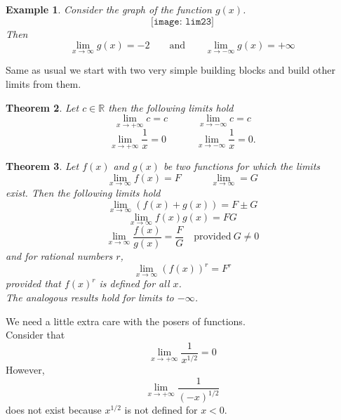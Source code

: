 \documentclass[12pt,a4paper]{book}
\newtheorem{theorem}{Theorem}[section]
\newtheorem{Example}[theorem]{Example}
\numberwithin{equation}{section}
\begin{document}
\begin{Example}
	Consider the graph of the function $g(x)$. 
	$$
	\texttt{[image: lim23]}
	$$
	Then 
	$$\lim_{x\to \infty} g(x)=-2\quad \quad \text{and}\quad \quad \lim_{x\to -\infty} g(x)=+\infty$$ 
\end{Example}
Same as usual we start with two very simple building blocks and build other limits from them.
\begin{theorem}
	Let $c\in \mathbb{R}$ then the following limits hold
	$$\lim_{x\to +\infty} c=c\quad \quad \quad \lim_{x\to -\infty} c=c$$
		$$\lim_{x\to +\infty} \frac{1}{x}=0\quad \quad \quad \lim_{x\to -\infty} \frac{1}{x}=0.$$
\end{theorem}
\begin{tcolorbox}[width=\textwidth,colback={blue!10},title={},colbacktitle=yellow,coltitle=blue] 
\begin{theorem}
	Let $f(x)$ and $g(x)$ be two functions for which the limits 
	$$ \lim_{x\to \infty}f(x)=F\quad \quad \quad \lim_{x\to \infty}=G$$
	exist. Then the following limits hold
	$$
	\lim_{x\to \infty} (f(x)+g(x))=F\pm G
	$$
	$$
	\lim_{x\to \infty}f(x)g(x)=FG
	$$
	$$
	\lim_{x\to \infty}\frac{f(x)}{g(x)}=\frac{F}{G} \quad \text{provided}~G\neq 0
	$$
	and for rational numbers $r$,
		$$\lim_{x\to \infty}(f(x))^r=F^r$$ provided that $f(x)^r$ is defined for all $x$.\\
		The analogous results hold for limits to $-\infty$.
\end{theorem}
\end{tcolorbox}
We need a little extra care  with the posers of functions.\\
 Consider that 
$$\lim_{x\to +\infty}\frac{1}{x^{1/2}}=0$$ However, 
$$\lim_{x\to +\infty}\frac{1}{(-x)^{1/2}}$$  does not exist because $x^{1/2}$ is not defined for $x<0$.
\end{document}
